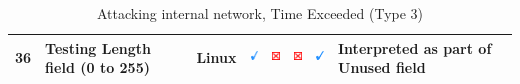 \documentclass[12pt]{article}
\begin{document}
\begin{savenotes}
\begin{table}[!h]
{{\begin{tabular}{|C{1.0cm}|L{6.0cm}|C{1.5cm}|C{1.0cm}|C{1.0cm}|C{1.0cm}|C{1.0cm}|L{7.0cm}|}
36&Testing Length field (0 to 255)&Linux&\includegraphics[width=4mm, height=4mm]{ok}&\includegraphics[width=4mm, height=4mm]{notok}&\includegraphics[width=4mm, height=4mm]{notok}&\includegraphics[width=4mm, height=4mm]{ok}&Interpreted as part of Unused field\\
\hline
\end{tabular}}}
\caption{Attacking internal network, Time Exceeded (Type 3)}
\label{table:attackInternalResults3}
\end{table}
\end{savenotes}
\end{document}
